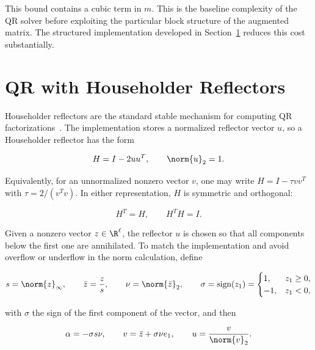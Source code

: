 \noindent This bound contains a cubic term in $m$.
This is the baseline complexity of the QR solver before exploiting the particular block structure of the augmented matrix. The structured implementation developed in Section~\ref{sec:householder_qr} reduces this cost substantially.


\section{QR with Householder Reflectors}
\label{sec:householder_qr}

\noindent Householder reflectors are the standard stable mechanism for computing QR factorizations~\cite{trefethen1997,golub2013}. The implementation stores a normalized reflector vector $u$, so a Householder reflector has the form

\begin{equation}
\label{eq:householder_def}
    H = I - 2uu^T,
    \qquad
    \norm{u}_2=1.
\end{equation}

\noindent Equivalently, for an unnormalized nonzero vector $v$, one may write
$H=I-\tau vv^T$ with $\tau=2/(v^T v)$. In either representation, $H$ is
symmetric and orthogonal:

\begin{equation}
    H^T = H,
    \qquad
    H^T H = I.
\end{equation}

\noindent Given a nonzero vector $z\in\R^\ell$, the reflector $u$ is chosen so that all components below the first one are annihilated. To match the implementation and
avoid overflow or underflow in the norm calculation, define

\begin{equation}
\label{eq:stable_householder_vector}
    s=\norm{z}_\infty,
    \qquad
    \bar z=\frac{z}{s},
    \qquad
    \nu=\norm{\bar z}_2,
    \qquad
    \sigma=\text{sign}(z_1)=\begin{cases}1,&z_1\geq0,\\-1,&z_1<0,
    \end{cases}
\end{equation}

\noindent with $\sigma$ the sign of the first component of the vector, and then

\begin{equation}
    \alpha=-\sigma s\nu,
    \qquad
    v=\bar z+\sigma\nu e_1,
    \qquad
    u=\frac{v}{\norm{v}_2}.
\end{equation}

